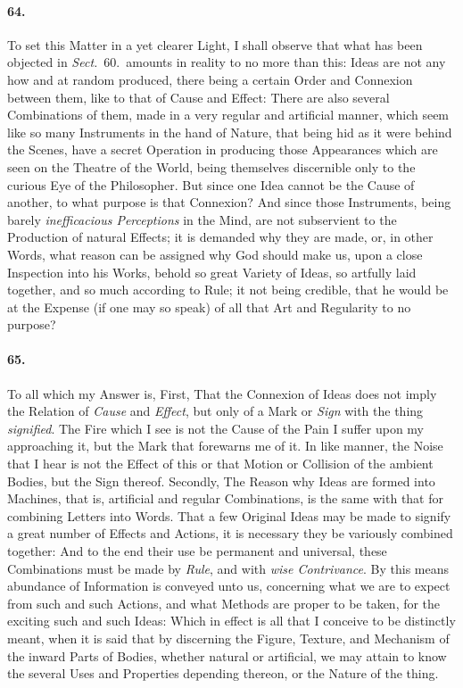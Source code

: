 \documentclass[]{article}
\newenvironment{sectionbody}{\begin{multicols}{2}}{\end{multicols}}
\begin{document}
\begin{sectionbody}
\paragraph{64.} To set this Matter in a yet clearer Light, I shall observe that
what has been objected in \emph{Sect.}~60.\ amounts in reality to
no more than this: Ideas are not any how
and at random produced, there being a certain Order and Connexion
between them, like to that of Cause and Effect: There are also
several Combinations of them, made in a very regular and
artificial manner, which seem like so many Instruments in the
hand of Nature, that being hid as it were behind the Scenes, have
a secret Operation in producing those Appearances which are seen
on the Theatre of the World, being themselves discernible only to
the curious Eye of the Philosopher.  But since one Idea cannot be
the Cause of another, to what purpose is that Connexion? And
since those Instruments, being barely \emph{inefficacious
Perceptions} in the Mind, are not subservient to the
Production of natural Effects; it is demanded why they are made,
or, in other Words, what reason can be assigned why God should
make us, upon a close Inspection into his Works, behold so great
Variety of Ideas, so artfully laid together, and so much
according to Rule; it not being credible, that he would be at the
Expense (if one may so speak) of all that Art and Regularity to
no purpose?



\paragraph{65.} To all which my Answer is, First, That the Connexion of Ideas
does not imply the Relation of \emph{Cause} and
\emph{Effect}, but only of a Mark or \emph{Sign} with the
thing \emph{signified}.  The Fire which I see is not the Cause
of the Pain I suffer upon my approaching it, but the Mark that
forewarns me of it.  In like manner, the Noise that I hear is not
the Effect of this or that Motion or Collision of the ambient
Bodies, but the Sign thereof.  Secondly, The Reason why Ideas are
formed into Machines, that is, artificial and regular
Combinations, is the same with that for combining Letters into
Words.  That a few Original Ideas may be made to signify a great
number of Effects and Actions, it is necessary they be variously
combined together: And to the end their use be permanent and
universal, these Combinations must be made by \emph{Rule}, and
with \emph{wise Contrivance}.  By this means abundance of
Information is conveyed unto us, concerning what we are to expect
from such and such Actions, and what Methods are proper to be
taken, for the exciting such and such Ideas: Which in effect is
all that I conceive to be distinctly meant, when it is said that
by discerning the Figure, Texture, and Mechanism of the inward
Parts of Bodies, whether natural or artificial, we may attain to
know the several Uses and Properties depending thereon, or the
Nature of the thing.




\end{sectionbody}
\end{document}

